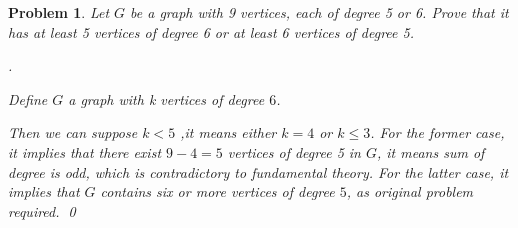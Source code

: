 \documentclass[12pt]{article}
\newtheorem{hw}{Problem}
\newenvironment{sol}
  {\par\vspace{3mm}\noindent{\it Solution}.}
  {\qed}
\begin{document}
\begin{hw}
Let $G$ be a graph with 9 vertices, each of degree 5 or 6. Prove that it has at least 5 vertices of degree 6 or at least 6 vertices of degree 5.
\item
\begin{sol}\par
\renewcommand{\qedsymbol}{}
     Define $G$ a graph with k vertices of degree $6$.\par
     Then we can suppose $k < 5$ ,it means either $k = 4$ or $k \leq 3$. For the former case, it implies that there exist $9 − 4 = 5$ vertices of degree 5 in $G$, it means sum of degree is odd, which is contradictory to fundamental theory. For the latter case, it implies that $G$ contains six or more vertices of degree $5$, as  original problem required.
\end{sol}

\end{hw}
\end{document}
